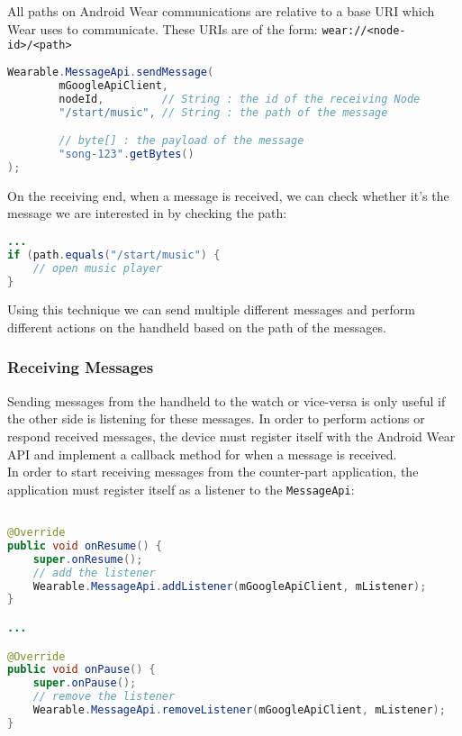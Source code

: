 All paths on Android Wear communications are relative to a base URI which Wear
uses to communicate. These URIs are of the form:
\texttt{wear://<node-id>/<path>}

\begin{lstlisting}[language=Java]
Wearable.MessageApi.sendMessage(
        mGoogleApiClient,
        nodeId,         // String : the id of the receiving Node
        "/start/music", // String : the path of the message

        // byte[] : the payload of the message
        "song-123".getBytes()
);
\end{lstlisting}

On the receiving end, when a message is received, we can check whether it's the
message we are interested in by checking the path:

\begin{lstlisting}[language=Java]
...
if (path.equals("/start/music") {
    // open music player
}
\end{lstlisting}

Using this technique we can send multiple different messages and perform
different actions on the handheld based on the path of the messages.

\subsubsection{Receiving Messages}
Sending messages from the handheld to the watch or vice-versa is only useful if
the other side is listening for these messages. In order to perform actions or
respond received messages, the device must register itself with the Android Wear
API and implement a callback method for when a message is received.\\
In order to start receiving messages from the counter-part application, the
application must register itself as a listener to the \texttt{MessageApi}:

\begin{lstlisting}[language=Java]

@Override
public void onResume() {
    super.onResume();
    // add the listener
    Wearable.MessageApi.addListener(mGoogleApiClient, mListener);
}

...

@Override
public void onPause() {
    super.onPause();
    // remove the listener
    Wearable.MessageApi.removeListener(mGoogleApiClient, mListener);
}
\end{lstlisting}

